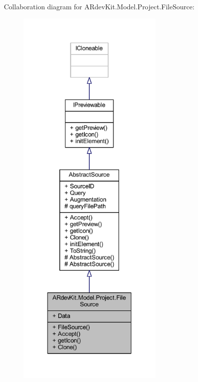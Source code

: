 Collaboration diagram for A\-Rdev\-Kit.\-Model.\-Project.\-File\-Source\-:
\nopagebreak
\begin{figure}[H]
\begin{center}
\leavevmode
\includegraphics[height=550pt]{class_a_rdev_kit_1_1_model_1_1_project_1_1_file_source__coll__graph}
\end{center}
\end{figure}
